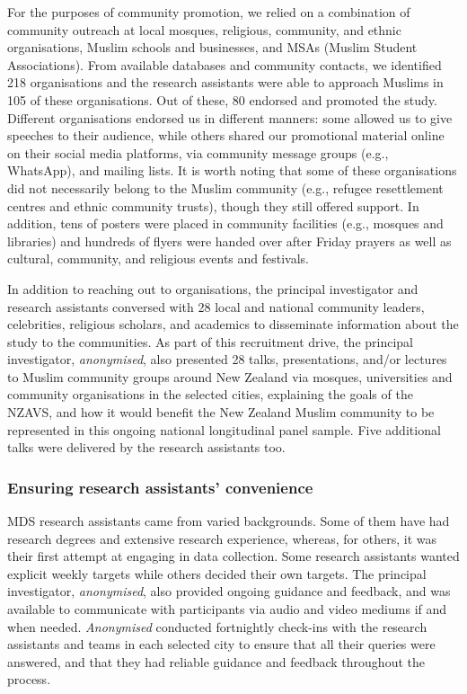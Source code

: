 \documentclass[
]{interact}
\begin{document}
For the purposes of community promotion, we relied on a combination of
community outreach at local mosques, religious, community, and ethnic
organisations, Muslim schools and businesses, and MSAs (Muslim Student
Associations). From available databases and community contacts, we
identified 218 organisations and the research assistants were able to
approach Muslims in 105 of these organisations. Out of these, 80
endorsed and promoted the study. Different organisations endorsed us in
different manners: some allowed us to give speeches to their audience,
while others shared our promotional material online on their social
media platforms, via community message groups (e.g., WhatsApp), and
mailing lists. It is worth noting that some of these organisations did
not necessarily belong to the Muslim community (e.g., refugee
resettlement centres and ethnic community trusts), though they still
offered support. In addition, tens of posters were placed in community
facilities (e.g., mosques and libraries) and hundreds of flyers were
handed over after Friday prayers as well as cultural, community, and
religious events and festivals.

In addition to reaching out to organisations, the principal investigator
and research assistants conversed with 28 local and national community
leaders, celebrities, religious scholars, and academics to disseminate
information about the study to the communities. As part of this
recruitment drive, the principal investigator, \emph{anonymised}, also
presented 28 talks, presentations, and/or lectures to Muslim community
groups around New Zealand via mosques, universities and community
organisations in the selected cities, explaining the goals of the NZAVS,
and how it would benefit the New Zealand Muslim community to be
represented in this ongoing national longitudinal panel sample. Five
additional talks were delivered by the research assistants too.

\subsubsection{Ensuring research assistants'
convenience}\label{ensuring-research-assistants-convenience}

MDS research assistants came from varied backgrounds. Some of them have
had research degrees and extensive research experience, whereas, for
others, it was their first attempt at engaging in data collection. Some
research assistants wanted explicit weekly targets while others decided
their own targets. The principal investigator, \emph{anonymised}, also
provided ongoing guidance and feedback, and was available to communicate
with participants via audio and video mediums if and when needed.
\emph{Anonymised} conducted fortnightly check-ins with the research
assistants and teams in each selected city to ensure that all their
queries were answered, and that they had reliable guidance and feedback
throughout the process.
\end{document}

